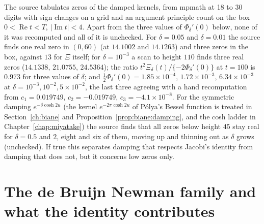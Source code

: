 The source tabulates zeros of the damped kernels, from mpmath at 18 to 30 digits with sign changes on a grid and an argument principle count on the box $0<\operatorname{Re}t<T$, $|\operatorname{Im}t|<4$. Apart from the three values of $\Phi_\delta'(0)$ below, none of it was recomputed and all of it is unchecked. For $\delta=0.05$ and $\delta=0.01$ the source finds one real zero in $(0,60)$ (at $14.1002$ and $14.1263$) and three zeros in the box, against $13$ for $\Xi$ itself; for $\delta=10^{-3}$ a scan to height $110$ finds three real zeros ($14.1338$, $21.0755$, $24.5364$); the ratio $t^2\Xi_\delta(t)/\{-2\Phi_\delta'(0)\}$ at $t=100$ is $0.973$ for three values of $\delta$; and $\frac12\Phi_\delta'(0)=1.85\times10^{-4}$, $1.72\times10^{-3}$, $6.34\times10^{-3}$ at $\delta=10^{-3},10^{-2},5\times10^{-2}$, the last three agreeing with a hand recomputation from $c_1=0.019749$, $c_2=-0.019749$, $c_3=-4.1\times10^{-8}$. For the symmetric damping $e^{-\delta\cosh2u}$ (the kernel $e^{-2\pi\cosh2u}$ of P\'olya's Bessel function is treated in Section~\ref{ch:biane} and Proposition~\ref{prop:biane:damping}, and the cosh ladder in Chapter~\ref{chap:miyatake}) the source finds that all zeros below height $45$ stay real for $\delta=0.5$ and $2$, eight and six of them, moving up and thinning out as $\delta$ grows (unchecked). If true this separates damping that respects Jacobi's identity from damping that does not, but it concerns low zeros only.

\section{The de Bruijn Newman family and what the identity contributes}\label{cg:sec:dbn}

